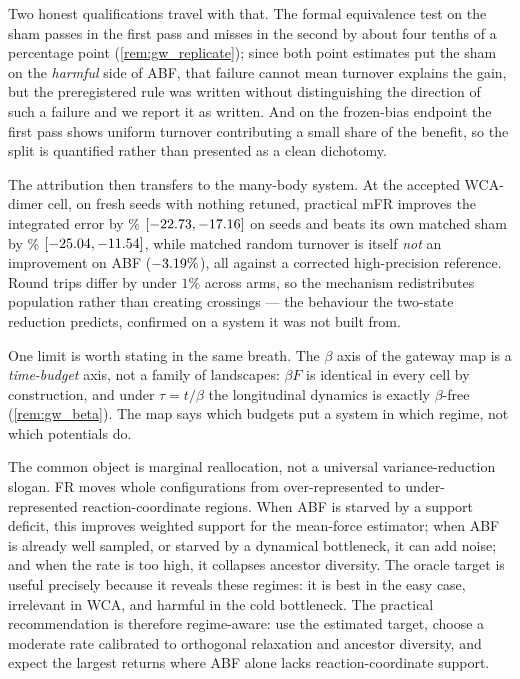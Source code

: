 Two honest qualifications travel with that. The formal equivalence test on the sham passes in
the first pass and misses in the second by about four tenths of a percentage point
(\cref{rem:gw_replicate}); since both point estimates put the sham on the \emph{harmful} side
of ABF, that failure cannot mean turnover explains the gain, but the preregistered rule was
written without distinguishing the direction of such a failure and we report it as written.
And on the frozen-bias endpoint the first pass shows uniform turnover contributing a small
share of the benefit, so the split is quantified rather than presented as a clean dichotomy.

The attribution then transfers to the many-body system. At the accepted WCA-dimer cell, on
\WcsSeeds{} fresh seeds with nothing retuned, practical mFR improves the integrated error by
\WcvEstGain\% $[-22.73, -17.16]$ on \WcvEstWins{} seeds and beats its own matched
sham by \WcvDirect\% $[-25.04, -11.54]$, while matched random turnover is
itself \emph{not} an improvement on ABF ($-3.19\%$), all against a corrected
high-precision reference. Round trips differ by under
$1\%$ across arms, so the mechanism redistributes population rather than creating crossings ---
the behaviour the two-state reduction predicts, confirmed on a system it was not built from.

One limit is worth stating in the same breath. The $\beta$ axis of the gateway map is a
\emph{time-budget} axis, not a family of landscapes: $\beta F$ is identical in every cell by
construction, and under $\tau = t/\beta$ the longitudinal dynamics is exactly $\beta$-free
(\cref{rem:gw_beta}). The map says which budgets put a system in which regime, not which
potentials do.

The common object is marginal reallocation, not a universal variance-reduction
slogan. FR moves whole configurations from over-represented to under-represented
reaction-coordinate regions. When ABF is starved by a support deficit, this improves weighted
support for the mean-force estimator; when ABF is already well sampled, or starved by a
dynamical bottleneck, it can add noise;
and when the rate is too high, it collapses ancestor diversity. The oracle target
is useful precisely because it reveals these regimes: it is best in the easy case,
irrelevant in WCA, and harmful in the cold bottleneck. The practical recommendation
is therefore regime-aware: use the estimated target, choose a moderate rate
calibrated to orthogonal relaxation and ancestor diversity, and expect the largest
returns where ABF alone lacks reaction-coordinate support.

